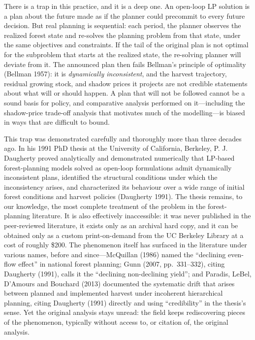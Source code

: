 \documentclass[12pt]{article}
\begin{document}
There is a trap in this practice, and it is a deep one. An open-loop LP solution is a plan about the future made as if the planner could precommit to every future decision. But real planning is sequential: each period, the planner observes the realized forest state and re-solves the planning problem from that state, under the same objectives and constraints. If the tail of the original plan is not optimal for the subproblem that starts at the realized state, the re-solving planner will deviate from it. The announced plan then fails Bellman's principle of optimality (Bellman 1957): it is \emph{dynamically inconsistent}, and the harvest trajectory, residual growing stock, and shadow prices it projects are not credible statements about what will or should happen. A plan that will not be followed cannot be a sound basis for policy, and comparative analysis performed on it---including the shadow-price trade-off analysis that motivates much of the modelling---is biased in ways that are difficult to bound.

This trap was demonstrated carefully and thoroughly more than three decades ago. In his 1991 PhD thesis at the University of California, Berkeley, P. J. Daugherty proved analytically and demonstrated numerically that LP-based forest-planning models solved as open-loop formulations admit dynamically inconsistent plans, identified the structural conditions under which the inconsistency arises, and characterized its behaviour over a wide range of initial forest conditions and harvest policies (Daugherty 1991). The thesis remains, to our knowledge, the most complete treatment of the problem in the forest-planning literature. It is also effectively inaccessible: it was never published in the peer-reviewed literature, it exists only as an archival hard copy, and it can be obtained only as a custom print-on-demand from the UC Berkeley Library at a cost of roughly \$200. The phenomenon itself has surfaced in the literature under various names, before and since---McQuillan (1986) named the ``declining even-flow effect'' in national forest planning; Gunn (2007, pp.~331--332), citing Daugherty (1991), calls it the ``declining non-declining yield''; and Paradis, LeBel, D'Amours and Bouchard (2013) documented the systematic drift that arises between planned and implemented harvest under incoherent hierarchical planning, citing Daugherty (1991) directly and using ``credibility'' in the thesis's sense. Yet the original analysis stays unread: the field keeps rediscovering pieces of the phenomenon, typically without access to, or citation of, the original analysis.
\end{document}
